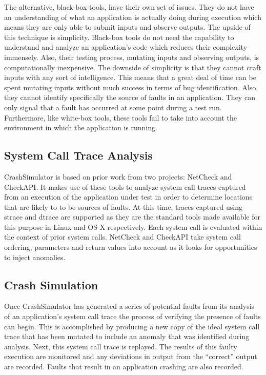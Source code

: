         The alternative, black-box tools, have their own set of issues. They do not have an understanding of what an
        application is actually doing during execution which means they are only able to submit inputs and observe
        outputs.  The upside of this technique is simplicity. Black-box tools do not need the capability to understand
        and analyze an application's code which reduces their complexity immensely. Also, their testing process,
        mutating inputs and observing outputs, is computationally inexpensive. The downside of simplicity is that they
        cannot craft inputs with any sort of intelligence. This means that a great deal of time can be spent mutating
        inputs without much success in terms of bug identification. Also, they cannot identify specifically the source
        of faults in an application. They can only signal that a fault has occurred at some point during a test run.
        Furthermore, like white-box tools, these tools fail to take into account the environment in which the
        application is running.

    \subsection{System Call Trace Analysis}

        CrashSimulator is based on prior work from two projects: NetCheck and CheckAPI. It makes use of these tools to
        analyze system call traces captured from an execution of the application under test in order to determine
        locations that are likely to to be sources of faults. At this time, traces captured using strace and dtrace are
        supported as they are the standard tools made available for this purpose in Linux and OS X respectively. Each
        system call is evaluated within the context of prior system calls. NetCheck and CheckAPI take system call
        ordering, parameters and return values into account as it looks for opportunities to inject anomalies.

    \subsection{Crash Simulation}

        Once CrashSimulator has generated a series of potential faults from its analysis of an application's system call
        trace the process of verifying the presence of faults can begin. This is accomplished by producing a new copy of
        the ideal system call trace that has been mutated to include an anomaly that was identified during analysis.
        Next, this system call trace is replayed. The results of this faulty execution are monitored and any deviations
        in output from the ``correct'' output are recorded.  Faults that result in an application crashing are also
        recorded.

